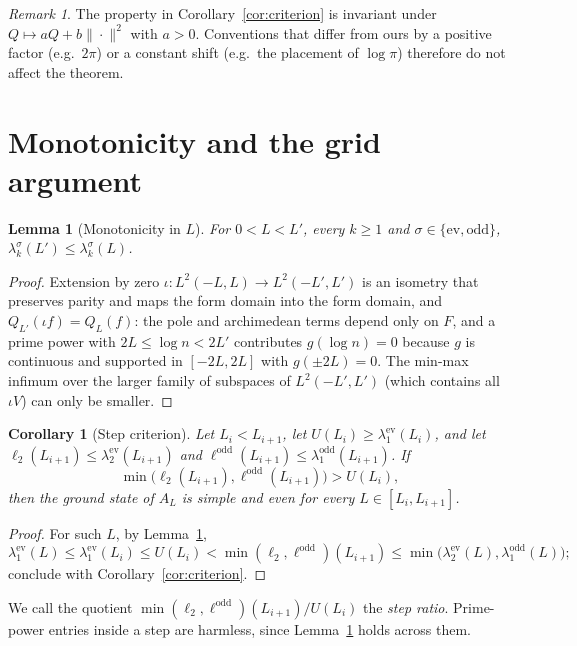 \documentclass[11pt]{amsart}
\newcommand{\ev}{\mathrm{ev}}
\newcommand{\od}{\mathrm{odd}}
\newtheorem{lemma}[theorem]{Lemma}
\newtheorem{corollary}[theorem]{Corollary}
\theoremstyle{definition}
\theoremstyle{remark}
\newtheorem{remark}[theorem]{Remark}
\numberwithin{equation}{section}
\begin{document}
\begin{remark}\label{rem:affine}
The property in Corollary~\ref{cor:criterion} is invariant under $Q\mapsto aQ+b\|\cdot\|^2$ with $a>0$. Conventions that differ from ours by a positive factor (e.g.\ $2\pi$) or a constant shift (e.g.\ the placement of $\log\pi$) therefore do not affect the theorem.
\end{remark}

\section{Monotonicity and the grid argument}\label{sec:mono}

\begin{lemma}[Monotonicity in $L$]\label{lem:mono}
For $0<L<L'$, every $k\ge1$ and $\sigma\in\{\ev,\od\}$, $\lambda_k^\sigma(L')\le\lambda_k^\sigma(L)$.
\end{lemma}
\begin{proof}
Extension by zero $\iota:L^2(-L,L)\to L^2(-L',L')$ is an isometry that preserves parity and maps the form domain into the form domain, and $Q_{L'}(\iota f)=Q_L(f)$: the pole and archimedean terms depend only on $F$, and a prime power with $2L\le\log n<2L'$ contributes $g(\log n)=0$ because $g$ is continuous and supported in $[-2L,2L]$ with $g(\pm2L)=0$. The min-max infimum over the larger family of subspaces of $L^2(-L',L')$ (which contains all $\iota V$) can only be smaller.
\end{proof}

\begin{corollary}[Step criterion]\label{cor:step}
Let $L_i<L_{i+1}$, let $U(L_i)\ge\lambda_1^\ev(L_i)$, and let $\ell_2(L_{i+1})\le\lambda_2^\ev(L_{i+1})$ and $\ell^\od(L_{i+1})\le\lambda_1^\od(L_{i+1})$. If
\begin{equation}\label{eq:step}
\min\bigl(\ell_2(L_{i+1}),\ell^\od(L_{i+1})\bigr)>U(L_i),
\end{equation}
then the ground state of $A_L$ is simple and even for every $L\in[L_i,L_{i+1}]$.
\end{corollary}
\begin{proof}
For such $L$, by Lemma~\ref{lem:mono},
\[
\lambda_1^\ev(L)\le\lambda_1^\ev(L_i)\le U(L_i)<\min(\ell_2,\ell^\od)(L_{i+1})\le\min\bigl(\lambda_2^\ev(L),\lambda_1^\od(L)\bigr);
\]
conclude with Corollary~\ref{cor:criterion}.
\end{proof}

We call the quotient $\min(\ell_2,\ell^\od)(L_{i+1})/U(L_i)$ the \emph{step ratio}. Prime-power entries inside a step are harmless, since Lemma~\ref{lem:mono} holds across them.
\end{document}
